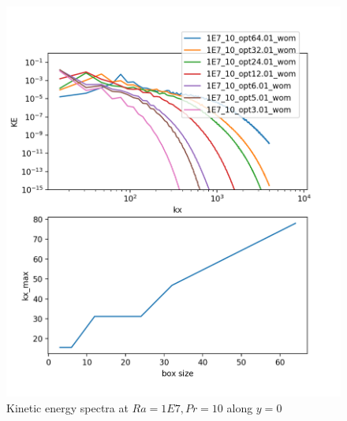\documentclass[12pt]{article}
\begin{document}
     
     \begin{figure}[!htb]
     	\includegraphics[width=\linewidth]{KE_1E7_10.png}
     	\caption{ Kinetic energy spectra at $Ra = 1E7, Pr =10$ along $y = 0$}
     	\label{fig:fig23}
     \end{figure}
     
\end{document}
